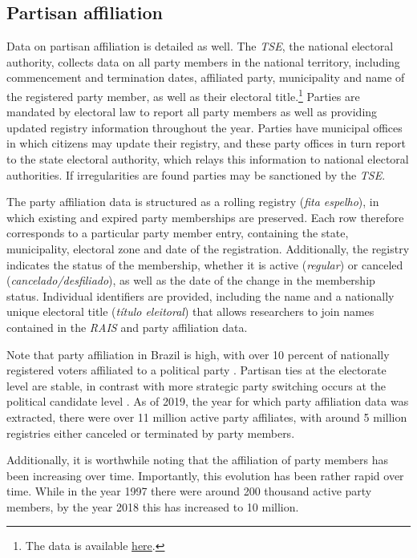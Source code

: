 \documentclass[12pt,a4paper]{article}
\begin{document}
\subsection{Partisan affiliation}

Data on partisan affiliation is detailed as well. The \emph{TSE}, the national electoral authority, collects data on all party members in the national territory, including commencement and termination dates, affiliated party, municipality and name of the registered party member, as well as their electoral title.\footnote{The data is available \href{https://filia-consulta.tse.jus.br/}{here}.} Parties are mandated by electoral law to report all party members as well as providing updated registry information throughout the year. Parties have municipal offices in which citizens may update their registry, and these party offices in turn report to the state electoral authority, which relays this information to national electoral authorities. If irregularities are found parties may be sanctioned by the \emph{TSE}.

The party affiliation data is structured as a rolling registry (\emph{fita espelho}), in which existing and expired party memberships are preserved. Each row therefore corresponds to a particular party member entry, containing the state, municipality, electoral zone and date of the registration. Additionally, the registry indicates the status of the membership, whether it is active (\emph{regular}) or canceled (\emph{cancelado/desfiliado}), as well as the date of the change in the membership status. Individual identifiers are provided, including the name and a nationally unique electoral title (\emph{t\'{i}tulo eleitoral}) that allows researchers to join names contained in the \emph{RAIS} and party affiliation data.

Note that party affiliation in Brazil is high, with over 10 percent of nationally registered voters affiliated to a political party \citep{speck2015estudo}. Partisan ties at the electorate level are stable, in contrast with more strategic party switching occurs at the political candidate level \citep{desposato2006parties}. As of 2019, the year for which party affiliation data was extracted, there were over 11 million active party affiliates, with around 5 million registries either canceled or terminated by party members.

Additionally, it is worthwhile noting that the affiliation of party members has been increasing over time. Importantly, this evolution has been rather rapid over time. While in the year 1997 there were around 200 thousand active party members, by the year 2018 this has increased to 10 million.
\end{document}
